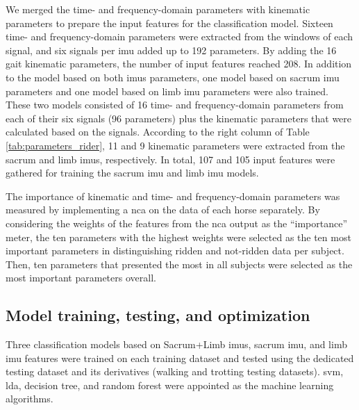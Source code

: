We merged the time- and frequency-domain parameters with kinematic parameters to prepare the input features for the classification model. Sixteen time- and frequency-domain parameters were extracted from the windows of each signal, and six signals per \gls{imu} added up to 192 parameters. By adding the 16 gait kinematic parameters, the number of input features reached 208. In addition to the model based on both \gls{imu}s parameters, one model based on sacrum \gls{imu} parameters and one model based on limb \gls{imu} parameters were also trained. These two models consisted of 16 time- and frequency-domain parameters from each of their six signals (96 parameters) plus the kinematic parameters that were calculated based on the signals. According to the right column of Table \ref{tab:parameters_rider}, 11 and 9 kinematic parameters were extracted from the sacrum and limb \gls{imu}s, respectively. In total, 107 and 105 input features were gathered for training the sacrum \gls{imu} and limb \gls{imu} models.

The importance of kinematic and time- and frequency-domain parameters was measured by implementing a \gls{nca} on the data of each horse separately. By considering the weights of the features from the \gls{nca} output as the “importance” meter, the ten parameters with the highest weights were selected as the ten most important parameters in distinguishing ridden and not-ridden data per subject. Then, ten parameters that presented the most in all subjects were selected as the most important parameters overall.

\subsection{Model training, testing, and optimization}
Three classification models based on Sacrum+Limb \gls{imu}s, sacrum \gls{imu}, and limb \gls{imu} features were trained on each training dataset and tested using the dedicated testing dataset and its derivatives (walking and trotting testing datasets). \gls{svm}, \gls{lda}, decision tree, and random forest were appointed as the machine learning algorithms.

